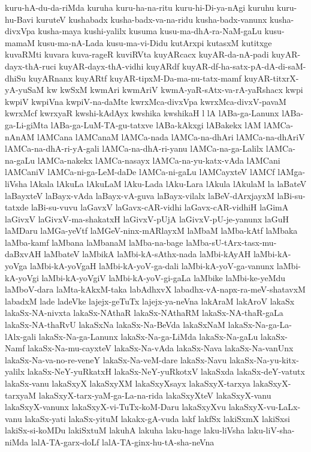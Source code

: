 {kuru-hA-du-da-riMda
kuruha
kuru-ha-na-ritu
kuru-hi-Di-ya-nAgi
kuruhu
kuru-hu-Bavi
kuruteV
kushabadx
kusha-badx-va-na-ridu
kusha-badx-vanunx
kusha-divxVpa
kusha-maya
kushi-yalilx
kusuma
kusu-ma-dhA-ra-NaM-gaLu
kusu-mamaM
kusu-ma-nA-Lada
kusu-ma-vi-Didu
kutArxpi
kutasxM
kutitxge
kuvaRMti
kuvara
kuva-rageR
kuviRVta
kuyARcacx
kuyAR-da-nA-padi
kuyAR-dayx-thA-ruci
kuyAR-dayx-thA-vidhi
kuyARdf
kuyAR-df-ha-satx-pA-dA-di-saM-dhiSu
kuyARnanx
kuyARtf
kuyAR-tipxM-Da-ma-nu-tatx-mamf
kuyAR-titxrX-yA-yuSaM
kw
kwSxM
kwmAri
kwmAriV
kwmA-yaR-sAtx-va-rA-yaRshacx
kwpi
kwpiV
kwpiVna
kwpiV-na-daMte
kwrxMca-divxVpa
kwrxMca-divxV-pavaM
kwrxMcf
kwrxyaR
kwshi-kAdAyx
kwshika
kwshikaH
l
lA
lABa-ga-Lanunx
lABa-ga-Li-giMta
lABa-ga-LuM-TA-gu-tatxve
lABa-kAkxgi
lABakekx
lAM
lAMCa-nAnAM
lAMCana
lAMCanaM
lAMCa-nada
lAMCa-na-dhAri
lAMCa-na-dhAriV
lAMCa-na-dhA-ri-yA-gali
lAMCa-na-dhA-ri-yanu
lAMCa-na-ga-Lalilx
lAMCa-na-gaLu
lAMCa-nakekx
lAMCa-nasayx
lAMCa-na-yu-katx-vAda
lAMCani
lAMCaniV
lAMCa-ni-ga-LeM-daDe
lAMCa-ni-gaLu
lAMCayxteV
lAMCf
lAMga-liVsha
lAkala
lAkuLa
lAkuLaM
lAku-Lada
lAku-Lara
lAkula
lAkulaM
la
laBateV
laBayxteV
laBayx-vAda
laBayx-vA-guva
laBayx-vilalx
laBeV-dArxjayxM
laBi-su-tatxde
laBi-su-vuvu
laGavxV
laGavx-cAR-vidhi
laGavx-cAR-vidhiH
laGimA
laGivxV
laGivxV-ma-shakatxH
laGivxV-pUjA
laGivxV-pU-je-yanunx
laGuH
laMDaru
laMGa-yeVtf
laMGeV-ninx-mARlayxM
laMbaM
laMba-kAtf
laMbaka
laMba-kamf
laMbana
laMbanaM
laMba-na-bage
laMba-sU-tArx-tasx-mu-daBxvAH
laMbateV
laMbikA
laMbi-kA-sAthx-nada
laMbi-kAyAH
laMbi-kA-yoVga
laMbi-kA-yoVgaH
laMbi-kA-yoV-ga-dali
laMbi-kA-yoV-ga-vanunx
laMbi-kA-yoVgi
laMbi-kA-yoVgiV
laMbi-kA-yoV-gi-gaLa
laMbike
laMbi-ke-yeMdu
laMboV-dara
laMta-kAkxM-taka
labAdhxvX
labadhx-vA-napx-ra-meV-shatavxM
labadxM
lade
ladeVke
lajejx-geTuTx
lajejx-ya-neVna
lakAraM
lakAroV
lakaSx
lakaSx-NA-nivxta
lakaSx-NAthaR
lakaSx-NAthaRM
lakaSx-NA-thaR-gaLa
lakaSx-NA-thaRvU
lakaSxNa
lakaSx-Na-BeVda
lakaSxNaM
lakaSx-Na-ga-La-lAlx-gali
lakaSx-Na-ga-Lanunx
lakaSx-Na-ga-LiMda
lakaSx-Na-gaLu
lakaSx-Namf
lakaSx-Na-mu-cayxteV
lakaSx-Na-vAda
lakaSx-Nava
lakaSx-Na-vanUnx
lakaSx-Na-va-no-re-veneY
lakaSx-Na-veM-dare
lakaSx-Navu
lakaSx-Na-yu-kitx-yalilx
lakaSx-NeY-yuRkatxH
lakaSx-NeY-yuRkotxV
lakaSxda
lakaSx-deY-vatutx
lakaSx-vanu
lakaSxyX
lakaSxyXM
lakaSxyXsayx
lakaSxyX-tarxya
lakaSxyX-tarxyaM
lakaSxyX-tarx-yaM-ga-La-na-rida
lakaSxyXteV
lakaSxyX-vanu
lakaSxyX-vanunx
lakaSxyX-vi-TuTx-koM-Daru
lakaSxyXvu
lakaSxyX-vu-LaLx-vanu
lakaSx-yati
lakaSx-yituM
lakakx-gA-vuda
lakf
lakfSx
lakiSxmX
lakiSxsi
lakiSx-si-koMDu
lakiSxtuM
lakuhA
lakuha
laku-hage
laku-liVsha
laku-liV-sha-niMda
lalA-TA-garx-doLf
lalA-TA-ginx-hu-tA-sha-neVna
}
